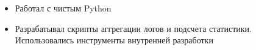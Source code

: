\begin{itemize}
	\item Работал с чистым Python
    \item Разрабатывал скрипты аггрегации логов и подсчета статистики. Использовались инструменты внутренней разработки
\end{itemize}
